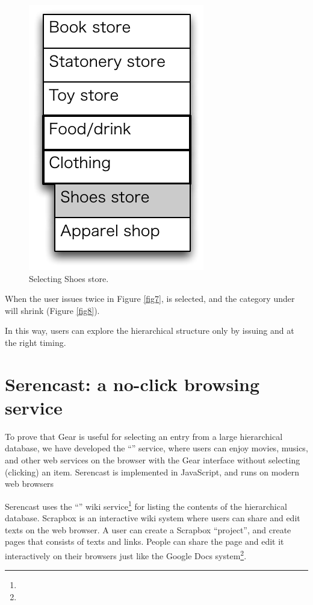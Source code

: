 \documentclass[conference]{IEEEtran}
\def\up{\tsf{▲}}
\def\down{\tsf{▼}}
\def\SC{Serencast}
\def\SB{Scrapbox}
\begin{document}
\begin{figure}[H]
\centerline{\includegraphics[width=\menuwidth,bb=0 0 139 211]{figures/fig9.pdf}}
\caption{Selecting Shoes store.}
\label{fig9}
\end{figure}

When the user issues {\down} twice in Figure \ref{fig7},
 is selected, and the category under  will shrink (Figure \ref{fig8}).

In this way, users can explore the hierarchical structure
only by issuing {\up} and {\down} at the right timing.

\section{Serencast: a no-click browsing service}


To prove that Gear is useful for selecting an entry from a
large hierarchical database,
we have developed the ``\tsf{\SC}'' service, where
users can enjoy movies, musics, and other web services
on the browser with the Gear interface without selecting (clicking) an item.
{\SC} is implemented in JavaScript, and runs on modern web browsers

{\SC} uses the ``\tsf{\SB}'' wiki service\footnote{
} for listing the contents of the hierarchical database.
{\SB} is an interactive wiki
system where users can share and edit texts on the web browser.
A user can create a {\SB} ``project'', and create pages
that consists of texts and links.
People can share the page and edit it interactively on their browsers
just like the Google Docs system\footnote{
}.
\end{document}
